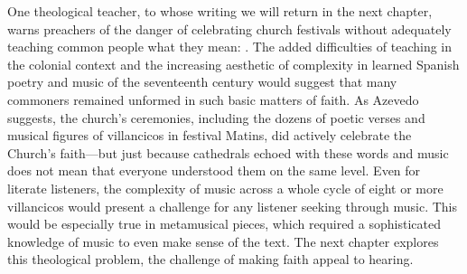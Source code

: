 One theological teacher, to whose writing we will return in the next chapter,
warns preachers of the danger of celebrating church festivals without
adequately teaching common people what they mean:
.%
    \Autocite[27]{Azevedo:Catecismo} 
The added difficulties of teaching in the colonial context and the increasing
aesthetic of complexity in learned Spanish poetry and music of the seventeenth
century would suggest that many commoners remained unformed in such basic
matters of faith.
As Azevedo suggests, the church's ceremonies, including the dozens of poetic
verses and musical figures of villancicos in festival Matins, did actively
celebrate the Church's faith---but just because cathedrals echoed with these
words and music does not mean that everyone understood them on the same level.
Even for literate listeners, the complexity of music across a whole cycle of
eight or more villancicos would present a challenge for any listener seeking
 through music.
This would be especially true in metamusical pieces, which required a
sophisticated knowledge of music to even make sense of the text.
The next chapter explores this theological problem, the challenge of making
faith appeal to hearing.


\endinput
